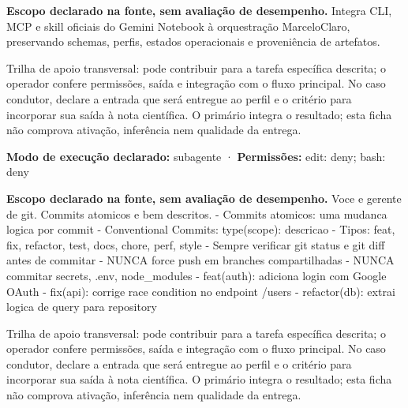 
\begin{descricao}
\textbf{Escopo declarado na fonte, sem avaliação de desempenho.}
Integra CLI, MCP e skill oficiais do Gemini Notebook à orquestração MarceloClaro, preservando schemas, perfis, estados operacionais e proveniência de artefatos.
\end{descricao}

\begin{funcao}
Trilha de apoio transversal: pode contribuir para a tarefa específica descrita; o operador confere permissões, saída e integração com o fluxo principal. No caso condutor, declare a entrada que será entregue ao perfil e o critério para incorporar sua saída à nota científica. O primário integra o resultado; esta ficha não comprova ativação, inferência nem qualidade da entrega.
\end{funcao}

\begin{arquitetura}
\textbf{Modo de execução declarado:} subagente · \textbf{Permissões:} edit: deny; bash: deny
\end{arquitetura}


\begin{descricao}
\textbf{Escopo declarado na fonte, sem avaliação de desempenho.}
Voce e gerente de git. Commits atomicos e bem descritos. - Commits atomicos: uma mudanca logica por commit - Conventional Commits: type(scope): descricao - Tipos: feat, fix, refactor, test, docs, chore, perf, style - Sempre verificar git status e git diff antes de commitar - NUNCA force push em branches compartilhadas - NUNCA commitar secrets, .env, node\_modules - feat(auth): adiciona login com Google OAuth - fix(api): corrige race condition no endpoint /users - refactor(db): extrai logica de query para repository
\end{descricao}

\begin{funcao}
Trilha de apoio transversal: pode contribuir para a tarefa específica descrita; o operador confere permissões, saída e integração com o fluxo principal. No caso condutor, declare a entrada que será entregue ao perfil e o critério para incorporar sua saída à nota científica. O primário integra o resultado; esta ficha não comprova ativação, inferência nem qualidade da entrega.
\end{funcao}

